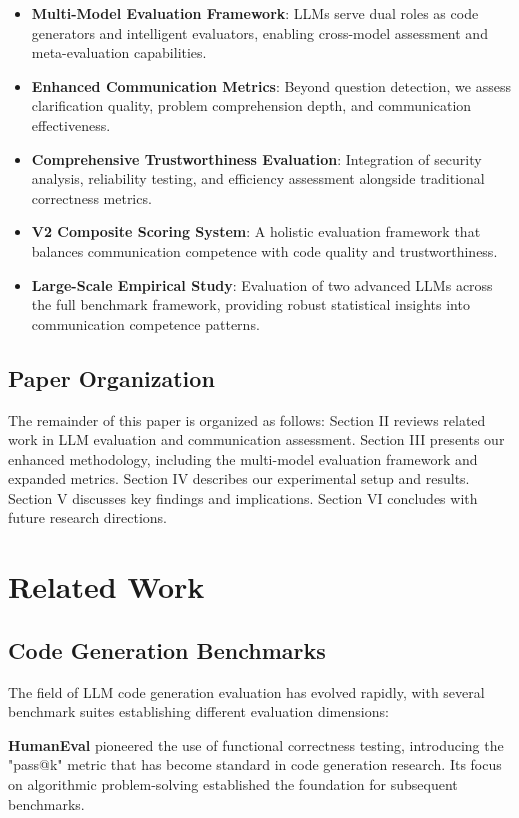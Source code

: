 \documentclass[conference]{IEEEtran}
\begin{document}
\begin{itemize}
    \item \textbf{Multi-Model Evaluation Framework}: LLMs serve dual roles as code generators and intelligent evaluators, enabling cross-model assessment and meta-evaluation capabilities.
    \item \textbf{Enhanced Communication Metrics}: Beyond question detection, we assess clarification quality, problem comprehension depth, and communication effectiveness.
    \item \textbf{Comprehensive Trustworthiness Evaluation}: Integration of security analysis, reliability testing, and efficiency assessment alongside traditional correctness metrics.
    \item \textbf{V2 Composite Scoring System}: A holistic evaluation framework that balances communication competence with code quality and trustworthiness.
    \item \textbf{Large-Scale Empirical Study}: Evaluation of two advanced LLMs across the full benchmark framework, providing robust statistical insights into communication competence patterns.
\end{itemize}

\subsection{Paper Organization}

The remainder of this paper is organized as follows: Section II reviews related work in LLM evaluation and communication assessment. Section III presents our enhanced methodology, including the multi-model evaluation framework and expanded metrics. Section IV describes our experimental setup and results. Section V discusses key findings and implications. Section VI concludes with future research directions.

\section{Related Work}

\subsection{Code Generation Benchmarks}

The field of LLM code generation evaluation has evolved rapidly, with several benchmark suites establishing different evaluation dimensions:

\textbf{HumanEval} \cite{chen2021evaluating} pioneered the use of functional correctness testing, introducing the "pass@k" metric that has become standard in code generation research. Its focus on algorithmic problem-solving established the foundation for subsequent benchmarks.
\end{document}

